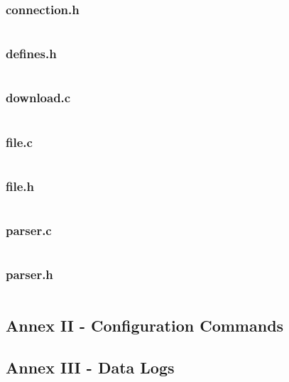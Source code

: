 \documentclass[11pt]{article}
\begin{document}
\inputminted{c}{connection.c}

\newpage

\subsubsection*{connection.h}

\inputminted{c}{connection.h}

\newpage

\subsubsection*{defines.h}

\inputminted{c}{defines.h}

\newpage

\subsubsection*{download.c}

\inputminted{c}{download.c}

\newpage

\subsubsection*{file.c}

\inputminted{c}{file.c}

\newpage

\subsubsection*{file.h}

\inputminted{c}{file.h}

\newpage

\subsubsection*{parser.c}

\inputminted{c}{parser.c}

\newpage

\subsubsection*{parser.h}

\inputminted{c}{parser.h}

\newpage

\subsection*{Annex II - Configuration Commands}

\subsection*{Annex III - Data Logs}
\end{document}
